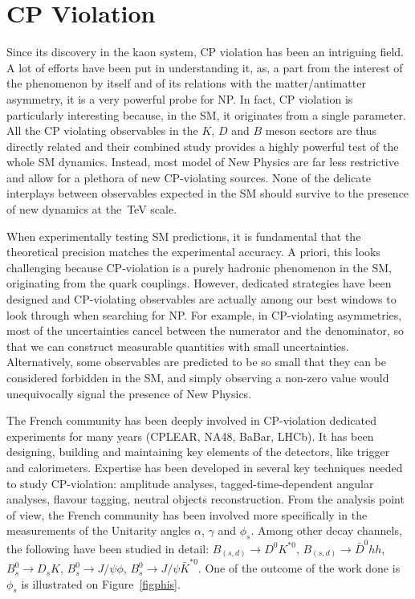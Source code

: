 

\section{CP Violation}
\label{sec:cpv}
Since its discovery in the kaon system, CP violation has been an intriguing field. A lot of efforts have been put in understanding it, as,  a part from the interest of the phenomenon by itself and of its relations with the matter/antimatter asymmetry, it is a very powerful probe for NP.  In fact,  CP violation is particularly interesting because, in the SM, it originates from a single parameter. All the CP violating observables in the $K$, $D$ and $B$ meson sectors are thus directly related and
their combined study provides a highly powerful test of the whole SM dynamics.
Instead, most model of New Physics are far less restrictive and allow for a
plethora of new CP-violating sources. None of the delicate interplays between
observables expected in the SM should survive to the presence of new dynamics
at the~TeV scale.


When experimentally testing SM predictions, it is fundamental that the
theoretical precision matches the experimental accuracy. A priori, this looks
challenging because CP-violation is a purely hadronic phenomenon in the SM,
originating from the quark couplings. However, dedicated strategies have been
designed and CP-violating observables are actually among our best windows to look through when searching for  NP. For
example, in CP-violating asymmetries, most of the uncertainties cancel between
the numerator and the denominator, so that we can construct measurable
quantities with small uncertainties. Alternatively, some observables are
predicted to be so small that they can be considered forbidden in the SM, and
simply observing a non-zero value would unequivocally signal the presence of
New Physics.

The French community has been deeply involved in CP-violation dedicated experiments for
many years (CPLEAR, NA48, BaBar, LHCb). It has been designing, building and maintaining key
elements of the detectors, like trigger and calorimeters. Expertise has been developed in
several key techniques needed to study CP-violation: amplitude analyses, tagged-time-dependent
angular analyses, flavour tagging, neutral objects reconstruction. From the analysis point of view,   the
French community has been involved more specifically in the measurements of the Unitarity angles
$\alpha$, $\gamma$ and $\phi_{s}$. Among other decay channels, the following
have been
studied in detail:
$B_{(s,d)}\to D^{0} K^{*0}$, $B_{(s,d)}\to\bar{D}^{0} hh$, $B^{0}_{s} \to
D_{s} K$, $B^{0}_{s} \to J/\psi\phi$,
$B^{0}_{s} \to J/\psi\bar{K}^{*0}$. 
One of the outcome of the work done is
$\phi_{s}$ is illustrated on Figure~\ref{figphis}.  

